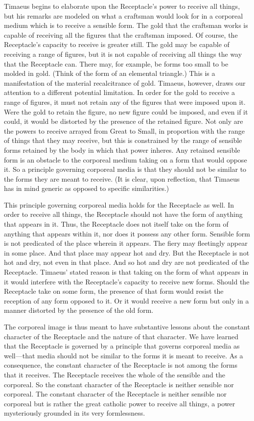 Timaeus begins to elaborate upon the Receptacle's power to receive all things, but his remarks are modeled on what a craftsman would look for in a corporeal medium which is to receive a sensible form. The gold that the craftsman works is capable of receiving all the figures that the craftsman imposed. Of course, the Receptacle's capacity to receive is greater still. The gold may be capable of receiving a range of figures, but it is not capable of receiving all things the way that the Receptacle can. There may, for example, be forms too small to be molded in gold. (Think of the form of an elemental triangle.) This is a manifestation of the material recalcitrance of gold. Timaeus, however, draws our attention to a different potential limitation. In order for the gold to receive a range of figures, it must not retain any of the figures that were imposed upon it. Were the gold to retain the figure, no new figure could be imposed, and even if it could, it would be distorted by the presence of the retained figure. Not only are the powers to receive arrayed from Great to Small, in proportion with the range of things that they may receive, but this is constrained by the range of sensible forms retained by the body in which that power inheres. Any retained sensible form is an obstacle to the corporeal medium taking on a form that would oppose it. So a principle governing corporeal media is that they should not be similar to the forms they are meant to receive. (It is clear, upon reflection, that Timaeus has in mind generic as opposed to specific similarities.)

This principle governing corporeal media holds for the Receptacle as well. In order to receive all things, the Receptacle should not have the form of anything that appears in it. Thus, the Receptacle does not itself take on the form of anything that appears within it, nor does it possess any other form. Sensible form is not predicated of the place wherein it appears. The fiery may fleetingly appear in some place. And that place may appear hot and dry. But the Receptacle is not hot and dry, not even in that place. And so hot and dry are not predicated of the Receptacle. Timaeus' stated reason is that taking on the form of what appears in it would interfere with the Receptacle's capacity to receive new forms. Should the Receptacle take on some form, the presence of that form would resist the reception of any form opposed to it. Or it would receive a new form but only in a manner distorted by the presence of the old form.

The corporeal image is thus meant to have substantive lessons about the constant character of the Receptacle and the nature of that character. We have learned that the Receptacle is governed by a principle that governs corporeal media as well---that media should not be similar to the forms it is meant to receive. As a consequence, the constant character of the Receptacle is not among the forms that it receives. The Receptacle receives the whole of the sensible and the corporeal. So the constant character of the Receptacle is neither sensible nor corporeal. The constant character of the Receptacle is neither sensible nor corporeal but is rather the great catholic power to receive all things, a power mysteriously grounded in its very formlessness.

